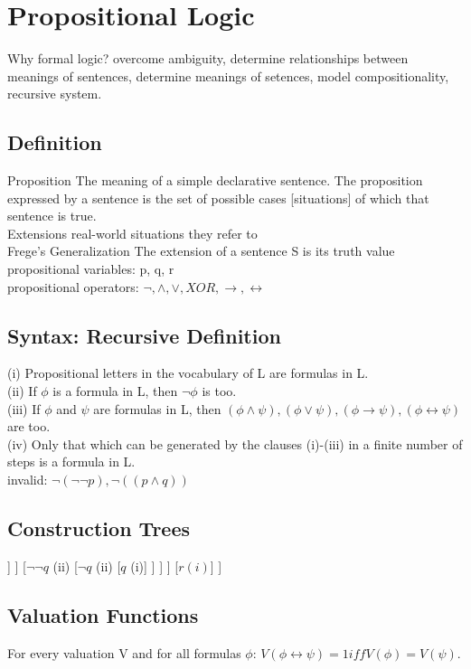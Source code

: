 \section{Propositional Logic}
Why formal logic? {\tiny overcome ambiguity, determine relationships between meanings of sentences, determine meanings of setences, model compositionality, recursive system.}
\subsection*{Definition}
Proposition {\tiny The meaning of a simple declarative sentence. The proposition expressed by a sentence is the set of possible cases [situations] of which that sentence is true.} \\
Extensions {\tiny real-world situations they refer to} \\
Frege’s Generalization {\tiny The extension of a sentence S is its truth value} \\
{\scriptsize propositional variables: p, q, r\\
propositional operators: $\neg, \land, \lor, XOR, \to, \leftrightarrow$}
\subsection*{Syntax: Recursive Definition}
{\scriptsize (i) Propositional letters in the vocabulary of L are formulas in L.\\
(ii) If $\phi$ is a formula in L, then $\neg \phi$ is too.\\
(iii) If $\phi$ and $\psi$ are formulas in L, then $(\phi \land \psi), (\phi \lor \psi), (\phi \to \psi), (\phi \leftrightarrow \psi)$ are too.\\
(iv) Only that which can be generated by the clauses (i)-(iii) in a finite number of steps is a formula in L.\\}
invalid: $\neg (\neg \neg p), \neg ((p \land q))$ 
\subsection*{Construction Trees}
\begin{forest}
[$(\neg (p \lor q) \to \neg \neg q) \leftrightarrow r$ $(iii. \leftrightarrow)$
	[$(\neg (p \lor q) \to \neg \neg q)$ $(iii. \to)$
		[$\neg (p \lor q)$ $(ii)$
			[$p \lor q$ $(iii. \lor)$
				[$p$ (i)]
				[$q$ (i)]
			]			
		]
		[$\neg \neg q$ (ii)
			[$\neg q$ (ii)
				[$q$ (i)]
			]
		]
	]
	[$r(i)$]
]
\end{forest}
\subsection*{Valuation Functions}
{\tiny For every valuation V and for all formulas} $\phi$: $V(\phi \leftrightarrow \psi) = 1 iff V(\phi) = V(\psi)$.